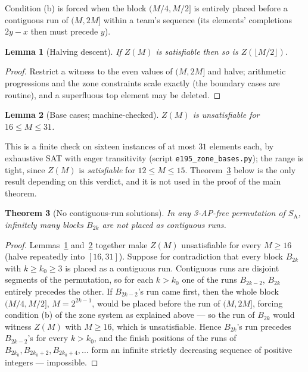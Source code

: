 \documentclass[11pt]{article}
\newtheorem{theorem}{Theorem}
\newtheorem{lemma}[theorem]{Lemma}
\theoremstyle{definition}
\newcommand{\SA}{S_{\mathrm{A}}}
\begin{document}
Condition (b) is forced when the block $(M/4, M/2]$ is entirely placed before a
contiguous run of $(M, 2M]$ within a team's sequence (its elements' completions
$2y - x$ then must precede $y$).

\begin{lemma}[Halving descent]\label{lem:halving}
If $Z(M)$ is satisfiable then so is $Z(\lfloor M/2 \rfloor)$.
\end{lemma}

\begin{proof}
Restrict a witness to the even values of $(M,2M]$ and halve; arithmetic
progressions and the zone constraints scale exactly (the boundary cases are
routine), and a superfluous top element may be deleted.
\end{proof}

\begin{lemma}[Base cases; machine-checked]\label{lem:bases}
$Z(M)$ is unsatisfiable for $16 \le M \le 31$.
\end{lemma}

\noindent This is a finite check on sixteen instances of at most $31$
elements each, by exhaustive SAT with eager transitivity (script
\texttt{e195\_zone\_bases.py}); the range is tight, since $Z(M)$ is
\emph{satisfiable} for $12 \le M \le 15$. Theorem~\ref{thm:contig} below
is the only result depending on this verdict, and it is not used in the
proof of the main theorem.

\begin{theorem}[No contiguous-run solutions]\label{thm:contig}
In any 3-AP-free permutation of $\SA$, infinitely many blocks $B_{2k}$ are
\emph{not} placed as contiguous runs.
\end{theorem}

\begin{proof}
Lemmas~\ref{lem:halving} and~\ref{lem:bases} together make $Z(M)$
unsatisfiable for every $M \ge 16$ (halve repeatedly into $[16, 31]$).
Suppose for contradiction that every block $B_{2k}$ with $k \ge k_0 \ge 3$
is placed as a contiguous run. Contiguous runs are disjoint segments of the
permutation, so for each $k > k_0$ one of the runs $B_{2k-2}$, $B_{2k}$
entirely precedes the other. If $B_{2k-2}$'s run came first, then the whole
block $(M/4, M/2]$, $M = 2^{2k-1}$, would be placed before the run of
$(M, 2M]$, forcing condition (b) of the zone system as explained above ---
so the run of $B_{2k}$ would witness $Z(M)$ with $M \ge 16$, which is
unsatisfiable. Hence $B_{2k}$'s run precedes $B_{2k-2}$'s for every
$k > k_0$, and the finish positions of the runs of
$B_{2k_0}, B_{2k_0+2}, B_{2k_0+4}, \dots$ form an infinite strictly
decreasing sequence of positive integers --- impossible.
\end{proof}
\end{document}

